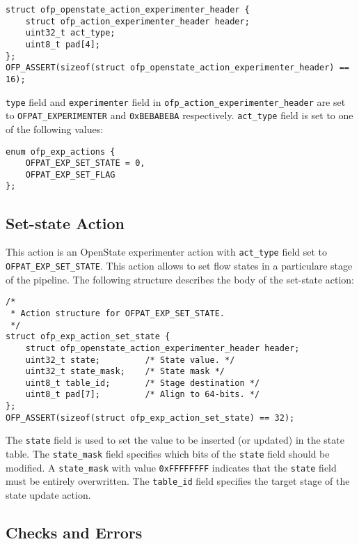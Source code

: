 \begin{verbatim}
struct ofp_openstate_action_experimenter_header {
    struct ofp_action_experimenter_header header;
    uint32_t act_type;
    uint8_t pad[4];
};
OFP_ASSERT(sizeof(struct ofp_openstate_action_experimenter_header) == 16);
\end{verbatim}
\texttt{type} field and \texttt{experimenter} field in \texttt{ofp\_action\_experimenter\_header} are set to \texttt{OFPAT\_EXPERIMENTER} and \texttt{0xBEBABEBA} respectively. \texttt{act\_type} field is set to one of the following values:

\begin{verbatim}
enum ofp_exp_actions {
    OFPAT_EXP_SET_STATE = 0,
    OFPAT_EXP_SET_FLAG
};
\end{verbatim}

\subsection{Set-state Action}
\label{sec:act_set_state_proto}

This action is an OpenState experimenter action with \texttt{act\_type} field set to \texttt{OFPAT\_EXP\_SET\_STATE}. This action allows to set flow states in a particulare stage of the pipeline. The following structure describes the body of the set-state action:

\begin{verbatim}
/*
 * Action structure for OFPAT_EXP_SET_STATE.
 */
struct ofp_exp_action_set_state {
    struct ofp_openstate_action_experimenter_header header;
    uint32_t state;         /* State value. */
    uint32_t state_mask;    /* State mask */
    uint8_t table_id;       /* Stage destination */
    uint8_t pad[7];         /* Align to 64-bits. */
};
OFP_ASSERT(sizeof(struct ofp_exp_action_set_state) == 32);
\end{verbatim}
The \texttt{state} field is used to set the value to be inserted (or updated) in the state table.
The \texttt{state\_mask} field specifies which bits of the \texttt{state} field should be modified. A \texttt{state\_mask} with value \texttt{0xFFFFFFFF} indicates that the \texttt{state} field must be entirely overwritten. The \texttt{table\_id} field specifies the target stage of the state update action.

\subsection{Checks and Errors}

